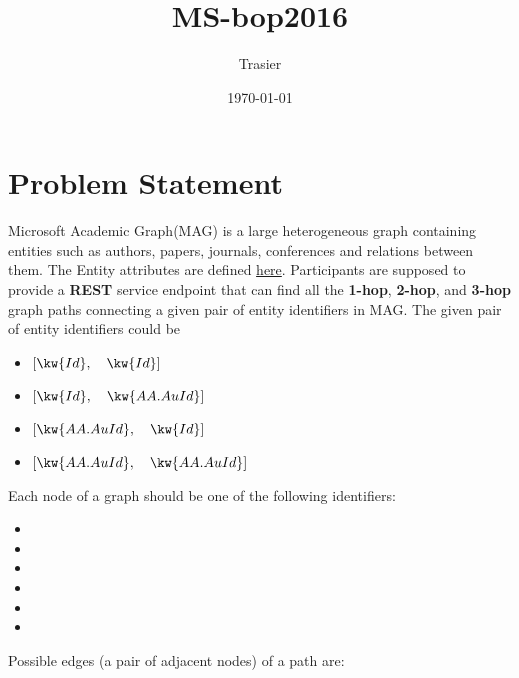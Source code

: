 \documentclass[hyperref,UTF8]{ctexart}
\theoremstyle{definition}
\theoremstyle{remark}
\numberwithin{equation}{subsection}
\newcommand{\Emph}{\textbf}
\begin{document}
\title{\Huge MS-bop2016}
\vspace{2cm}
\author{\Large Trasier}
\date{\today}
\maketitle

\section{Problem Statement}
\label{sec:problem_statement}
	
	Microsoft Academic Graph(MAG) is a large heterogeneous graph containing entities such as
	authors, papers, journals, conferences and relations between them.
	The Entity attributes are defined
	\href{https://www.microsoft.com/cognitive-services/en-us/academic-knowledge-api/documentation/entityattributes}{here}.
	Participants are supposed to provide a \Emph{REST} service endpoint that can find all the
	\Emph{1-hop}, \Emph{2-hop}, and \Emph{3-hop} graph paths connecting a given pair of entity identifiers in MAG.
	The given pair of entity identifiers could be
	\begin{itemize}
		\item $[\kw{Id},\quad \kw{Id}]$
		\item $[\kw{Id},\quad \kw{AA.AuId}]$
		\item $[\kw{AA.AuId},\quad \kw{Id}]$
		\item $[\kw{AA.AuId},\quad \kw{AA.AuId}]$
	\end{itemize}
	Each node of a graph should be one of the following identifiers:
	\begin{itemize}
		\item {}
		\item {}
		\item {}
		\item {}
		\item {}
		\item {}
	\end{itemize}
	Possible edges (a pair of adjacent nodes) of a path are:
\end{document}
